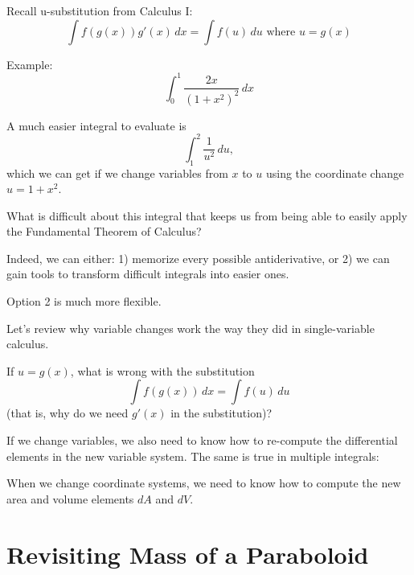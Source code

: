 \documentclass{ximera}
\begin{document}
\begin{problem}
Recall u-substitution from Calculus I:
$$\int f(g(x)) g'(x)\,dx = \int f(u)\,du \text{ where } u = g(x)$$

Example: $$\int_0^1 \frac{2x}{(1+x^2)^2}\,dx$$

A much easier integral to evaluate is $$\int_1^2 \frac{1}{u^2}\,du,$$ which we can get if we change variables from $x$ to $u$ using the coordinate change $u = 1 + x^2$.

What is difficult about this integral that keeps us from being able to easily apply the Fundamental Theorem of Calculus?
\begin{multipleChoice}
\end{multipleChoice}

Indeed, we can either: 1) memorize every possible antiderivative, or 2) we can gain tools to transform difficult integrals into easier ones.

Option 2 is much more flexible.

Let's review why variable changes work the way they did in single-variable calculus.

If $u=g(x)$, what is wrong with the substitution $$\int f(g(x))\,dx = \int f(u)\,du$$ (that is, why do we need $g'(x)$ in the substitution)?

\begin{multipleChoice}
\end{multipleChoice}


\end{problem}

If we change variables, we also need to know how to re-compute the differential elements in the new variable system. The same is true in multiple integrals: 

When we change coordinate systems, we need to know how to compute the new area and volume elements $dA$ and $dV$.

\section*{Revisiting Mass of a Paraboloid}
\end{document}
